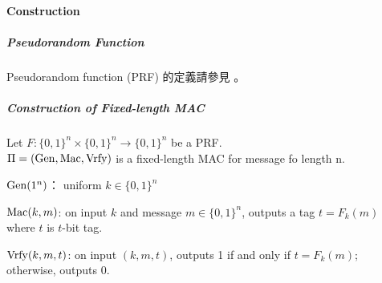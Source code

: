 \paragraph{Construction}

\subparagraph{Pseudorandom Function}

Pseudorandom function (PRF) 的定義請參見 。

\subparagraph{Construction of Fixed-length MAC}

Let \(F: \{0, 1\}^n \times \{0, 1\}^n \rightarrow \{0, 1\}^n\) be a PRF. \\
\(\Pi = (\operatorname{Gen}, \operatorname{\mathrm{Mac}}, \operatorname{\mathrm{Vrfy}})\) is a fixed-length MAC for message fo length n.
\begin{myItemize}
	\item \(\operatorname{Gen}(1^n)\)： uniform \(k \in \{0, 1\}^n\)
	\item \(\operatorname{\mathrm{Mac}}(k, m)\): on input \(k\) and message \(m \in \{0, 1\}^n\), outputs a tag \(t = F_k(m)\) where \(t\) is \(t\)-bit tag.
	\item \(\operatorname{\mathrm{Vrfy}}(k, m, t)\): on input \((k, m, t)\), outputs 1 if and only if \(t = F_k(m)\); otherwise, outputs 0.
\end{myItemize}
